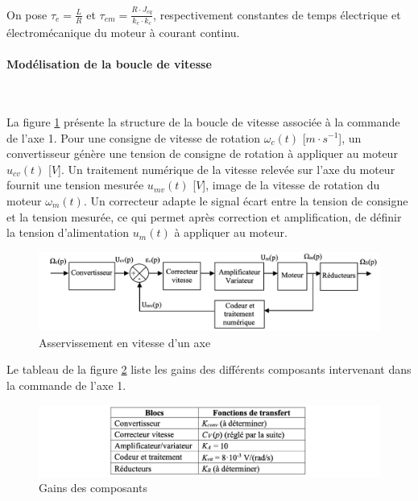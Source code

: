 On pose $\tau_e=\frac{L}{R}$ et $\tau_{em}=\frac{R\cdot J_{eq}}{k_e\cdot k_c}$, respectivement constantes de temps électrique et électromécanique du moteur à courant continu.



\paragraph{Modélisation de la boucle de vitesse} ~\

La figure \ref{fig15} présente la structure de la boucle de vitesse associée à la commande de l'axe 1. Pour une consigne de vitesse de rotation $\omega_c(t)$ [$m\cdot s^{-1}$], un convertisseur génère une tension de consigne de rotation à appliquer au moteur $u_{cv}(t)$ [$V$]. Un traitement numérique de la vitesse relevée sur l'axe du moteur fournit une tension mesurée $u_{mv}(t)$ [$V$], image de la vitesse de rotation du moteur $\omega_m(t)$. Un correcteur adapte le signal écart entre la tension de consigne et la tension mesurée, ce qui permet après correction et amplification, de définir la tension d'alimentation $u_m(t)$ à appliquer au moteur.

\begin{figure}[ht!]
\begin{center}
 \includegraphics[width=0.9\linewidth]{img/fig15}
\end{center}
\caption{Asservissement en vitesse d'un axe}
\label{fig15}
\end{figure}

Le tableau de la figure \ref{fig16} liste les gains des différents composants intervenant dans la commande de l'axe 1.

\begin{figure}[ht!]
\begin{center}
 \includegraphics[width=0.9\linewidth]{img/fig16}
\end{center}
\caption{Gains des composants}
\label{fig16}
\end{figure}

